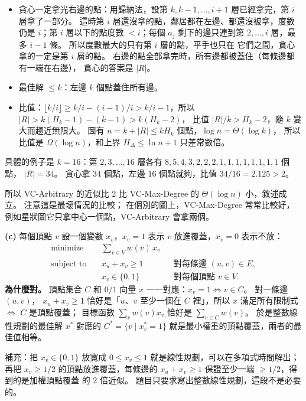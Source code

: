 \begin{pastsoln}
\begin{itemize}
\item 貪心一定拿光右邊的點：用歸納法，設第 $k, k - 1, \ldots, i + 1$ 層已經拿完，第 $i$ 層拿了一部分。
這時第 $i$ 層還沒拿的點，鄰居都在左邊、都還沒被拿，度數仍是 $i$；第 $i$ 層以下的點度數 $< i$；每個
$a_j$ 剩下的邊只連到第 $2, \ldots, i$ 層，最多 $i - 1$ 條。 所以度數最大的只有第 $i$ 層的點，平手也只在
它們之間，貪心拿的一定是第 $i$ 層的點。 右邊的點全部拿完時，所有邊都被蓋住（每條邊都有一端在右邊），
貪心的答案是 $|R|$。
\item 最佳解 $\le k$：左邊 $k$ 個點蓋住所有邊。
\item 比值：$\lfloor k/i \rfloor \ge k/i - (i-1)/i > k/i - 1$，所以 $|R| > k(H_k - 1) - (k - 1) > k(H_k - 2)$，
比值 $|R|/k > H_k - 2$，隨 $k$ 變大而趨近無限大。 圖有 $n = k + |R| \le k H_k$ 個點，$\log n = \Theta(\log k)$，
所以比值是 $\Omega(\log n)$，和上界 $H_\Delta \le \ln n + 1$ 只差常數倍。
\end{itemize}

具體的例子是 $k = 16$：第 $2, 3, \ldots, 16$ 層各有 $8, 5, 4, 3, 2, 2, 2, 1, 1, 1, 1, 1, 1, 1, 1$ 個點，
$|R| = 34$。 貪心拿 $34$ 個點，左邊 $16$ 個點就夠，比值 $34/16 = 2.125 > 2$。

所以 VC-Arbitrary 的近似比 $2$ 比 VC-Max-Degree 的 $\Theta(\log n)$ 小，敘述成立。 注意這是最壞情況的比較；
在個別的圖上，VC-Max-Degree 常常比較好，例如星狀圖它只拿中心一個點，VC-Arbitrary 會拿兩個。

\textbf{(c)} 每個頂點 $v$ 設一個變數 $x_v$，$x_v = 1$ 表示 $v$ 放進覆蓋，$x_v = 0$ 表示不放：
\begin{align*}
\text{minimize}\quad & \sum_{v \in V} w(v)\, x_v \\
\text{subject to}\quad & x_u + x_v \ge 1 && \text{對每條邊 } (u, v) \in E, \\
& x_v \in \{0, 1\} && \text{對每個頂點 } v \in V.
\end{align*}
\textbf{為什麼對。} 頂點集合 $C$ 和 $0/1$ 向量 $x$ 一一對應：$x_v = 1 \iff v \in C$。 對一條邊 $(u, v)$，
$x_u + x_v \ge 1$ 恰好是「$u$、$v$ 至少一個在 $C$ 裡」，所以 $x$ 滿足所有限制式 $\iff$ $C$ 是頂點覆蓋；
目標函數 $\sum_v w(v) x_v$ 恰好是 $\sum_{v \in C} w(v)$。 於是整數線性規劃的最佳解 $x^*$ 對應的
$C^* = \{v \mid x^*_v = 1\}$ 就是最小權重的頂點覆蓋，兩者的最佳值相等。

補充：把 $x_v \in \{0, 1\}$ 放寬成 $0 \le x_v \le 1$ 就是線性規劃，可以在多項式時間解出；再把
$x_v \ge 1/2$ 的頂點放進覆蓋，每條邊的 $x_u + x_v \ge 1$ 保證至少一端 $\ge 1/2$，得到的是加權頂點覆蓋
的 $2$ 倍近似。 題目只要求寫出整數線性規劃，這段不是必要的。
\end{pastsoln}
